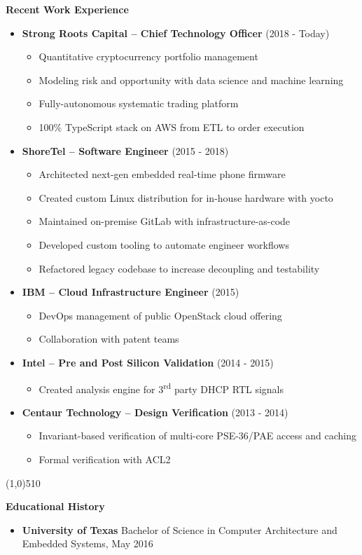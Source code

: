 \documentclass{report}
\newcommand{\cut}{\begin{center} \line(1,0){510} \end{center}}
\begin{document}
\textbf{Recent Work Experience}
\begin{itemize}[label=$\cdot$]

\item \textbf{Strong Roots Capital -- Chief Technology Officer} (2018 - Today)
  \begin{itemize}[label=$\circ$]
  \item Quantitative cryptocurrency portfolio management
  \item Modeling risk and opportunity with data science and machine learning
  \item Fully-autonomous systematic trading platform
  \item 100\% TypeScript stack on AWS from ETL to order execution
  \end{itemize}

\item \textbf{ShoreTel -- Software Engineer} (2015 - 2018)
  \begin{itemize}[label=$\circ$]
  \item Architected next-gen embedded real-time phone firmware
  \item Created custom Linux distribution for in-house hardware with yocto
  \item Maintained on-premise GitLab with infrastructure-as-code
  \item Developed custom tooling to automate engineer workflows
  \item Refactored legacy codebase to increase decoupling and testability
  \end{itemize}

\item \textbf{IBM -- Cloud Infrastructure Engineer} (2015)
  \begin{itemize}[label=$\circ$]
  \item DevOps management of public OpenStack cloud offering
  \item Collaboration with patent teams
  \end{itemize}

\item \textbf{Intel -- Pre and Post Silicon Validation} (2014 - 2015)
  \begin{itemize}[label=$\circ$]
  \item Created analysis engine for 3\textsuperscript{rd} party DHCP RTL signals
  \end{itemize}

\item \textbf{Centaur Technology -- Design Verification} (2013 - 2014)
  \begin{itemize}[label=$\circ$]
  \item Invariant-based verification of multi-core PSE-36/PAE access and caching
  \item Formal verification with ACL2
  \end{itemize}

\end{itemize}

\cut{}

\textbf{Educational History}
\begin{itemize}[label=$\cdot$]
\item \textbf{University of Texas} Bachelor of Science in Computer Architecture and Embedded Systems, May 2016
\end{itemize}
\end{document}
